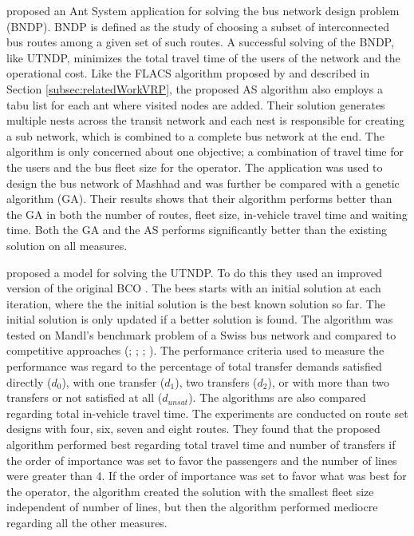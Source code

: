 \citet{poorzahedy11} proposed an Ant System application for solving the bus network design problem (BNDP). BNDP is defined as the study of choosing a subset of interconnected bus routes among a given set of such routes. A successful solving of the BNDP, like UTNDP, minimizes the total travel time of the users of the network and the operational cost. Like the FLACS algorithm proposed by \citet{salehinejad10} and described in Section \vref{subsec:relatedWorkVRP}, the proposed AS algorithm also employs a tabu list for each ant where visited nodes are added. Their solution generates multiple nests across the transit network and each nest is responsible for creating a sub network, which is combined to a complete bus network at the end. The algorithm is only concerned about one objective; a combination of travel time for the users and the bus fleet size for the operator. The application was used to design the bus network of Mashhad and was further be compared with a genetic algorithm (GA). Their results shows that their algorithm performs better than the GA in both the number of routes, fleet size, in-vehicle travel time and waiting time. Both the GA and the AS performs significantly better than the existing solution on all measures.  

\citet{nikolic14} proposed a model for solving the UTNDP. To do this they used an improved version of the original BCO \citep{lucic03}. The bees starts with an initial solution at each iteration, where the the initial solution is the best known solution so far. The initial solution is only updated if a better solution is found. The algorithm was tested on Mandl's benchmark problem of a Swiss bus network\citep{mandl80} and compared to competitive approaches (\citet{mandl80}; \citet{shih94}; \citet{baaj95}; \citet{bagloee11}). The performance criteria used to measure the performance was regard to the percentage of total transfer demands satisfied directly ($d_0$), with one transfer ($d_1$), two transfers ($d_2$), or with more than two transfers or not satisfied at all ($d_{unsat}$). The algorithms are also compared regarding total in-vehicle travel time. The experiments are conducted on route set designs with four, six, seven and eight routes. They found that the proposed algorithm performed best regarding total travel time and number of transfers if the order of importance was set to favor the passengers and the number of lines were greater than 4. If the order of importance was set to favor what was best for the operator, the algorithm created the solution with the smallest fleet size independent of number of lines, but then the algorithm performed mediocre regarding all the other measures. 

